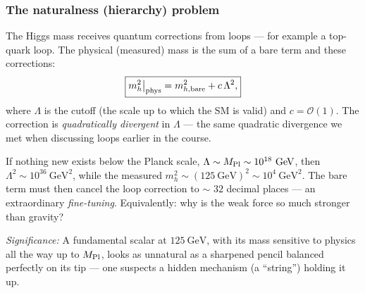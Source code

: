 \subsubsection*{The naturalness (hierarchy) problem}

The Higgs mass receives quantum corrections from loops --- for example a
top-quark loop. The physical (measured) mass is the sum of a bare term
and these corrections:
\begin{equation}
  \boxed{
    m_h^2\big|_{\rm phys}
    = m_{h,\rm bare}^2 + c\,\Lambda^2 ,
  }
  \label{eq:lec21:hierarchy}
\end{equation}
where $\Lambda$ is the cutoff (the scale up to which the SM is valid)
and $c=\mathcal O(1)$. The correction is \emph{quadratically divergent}
in $\Lambda$ --- the same quadratic divergence we met when discussing
loops earlier in the course.

If nothing new exists below the Planck scale,
$\Lambda\sim M_{\rm Pl}\sim 10^{18}~\text{GeV}$, then
$\Lambda^2\sim 10^{36}~\text{GeV}^2$, while the measured
$m_h^2\sim(125~\text{GeV})^2\sim 10^{4}~\text{GeV}^2$. The bare term must
then cancel the loop correction to $\sim$ $32$ decimal places --- an
extraordinary \emph{fine-tuning}. Equivalently: why is the weak force so
much stronger than gravity?

\textit{Significance:} A fundamental scalar at $125~\text{GeV}$, with its
mass sensitive to physics all the way up to $M_{\rm Pl}$, looks as
unnatural as a sharpened pencil balanced perfectly on its tip --- one
suspects a hidden mechanism (a ``string'') holding it up.


